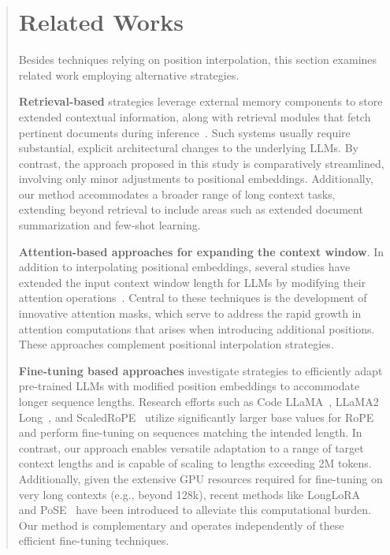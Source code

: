 \begin{abstract}
\section{Related Works}

Besides techniques relying on position interpolation, this section examines related work employing alternative strategies.

\textbf{Retrieval-based} strategies leverage external memory components to store extended contextual information, along with retrieval modules that fetch pertinent documents during inference~\cite{longllama,wang2023augmenting,borgeaud2022improving}. Such systems usually require substantial, explicit architectural changes to the underlying LLMs. By contrast, the approach proposed in this study is comparatively streamlined, involving only minor adjustments to positional embeddings. Additionally, our method accommodates a broader range of long context tasks, extending beyond retrieval to include areas such as extended document summarization and few-shot learning.

\textbf{Attention-based approaches for expanding the context window}. In addition to interpolating positional embeddings, several studies have extended the input context window length for LLMs by modifying their attention operations~\cite{han2023lminfinite, streamingllm,parallelwindow}. Central to these techniques is the development of innovative attention masks, which serve to address the rapid growth in attention computations that arises when introducing additional positions. These approaches complement positional interpolation strategies.

\textbf{Fine-tuning based approaches} investigate strategies to efficiently adapt pre-trained LLMs with modified position embeddings to accommodate longer sequence lengths. Research efforts such as Code LLaMA~\cite{codellama}, LLaMA2 Long~\cite{xiong2023effective}, and ScaledRoPE~\cite{liu2023scaling} utilize significantly larger base values for RoPE and perform fine-tuning on sequences matching the intended length. In contrast, our approach enables versatile adaptation to a range of target context lengths and is capable of scaling to lengths exceeding 2M tokens. Additionally, given the extensive GPU resources required for fine-tuning on very long contexts (e.g., beyond 128k), recent methods like LongLoRA~\cite{longlora} and PoSE~\cite{zhu2023pose} have been introduced to alleviate this computational burden. Our method is complementary and operates independently of these efficient fine-tuning techniques.


\end{abstract}
